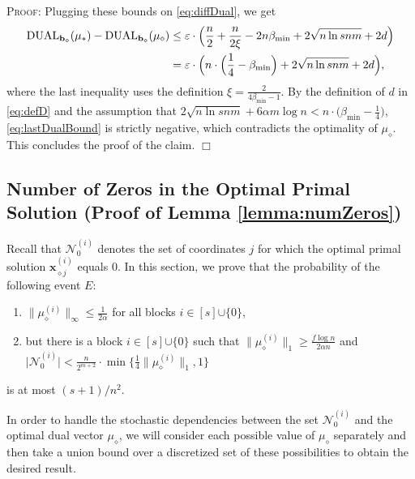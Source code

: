 \documentclass{article}
\newcommand{\e}{\varepsilon}
\newcommand{\xv}[0]{\mathbf{x}}
\newcommand{\bv}[0]{\mathbf{b}}
\newcommand{\normm}[1]{\big\lVert#1\big\rVert}
\newenvironment{proof}[1][]
   {\textsc{Proof#1: }}
   {\hfill$\Box$\smallskip}
\newcommand{\LAG}{\textup{DUAL}}
\begin{document}
\begin{proof}
    Plugging these bounds on \eqref{eq:diffDual}, we get
    \begin{align}
    \LAG_{\bv_{\diamond}}(\mu_*) - \LAG_{\bv_{\diamond}}(\mu_\diamond) &\le \e \cdot \Big(\frac{n}{2} + \frac{n}{2\xi} - 2n\beta_{\min} + 2 \sqrt{n \ln s n m} + 2d\Big) \notag\\
    &= \e \cdot \Big(n \cdot \Big(\frac{1}{4} - \beta_{\min}\Big) + 2 \sqrt{n \ln s n m} + 2d\Big), \label{eq:lastDualBound}
    \end{align}
    where the last inequality uses the definition $\xi = \frac{2}{4 \beta_{\min} - 1}$. By the definition of $d$ in \eqref{eq:defD} and the assumption that
    $2 \sqrt{n \ln s n m} + 6\alpha m \log n < n \cdot \big(\beta_{\min} - \frac{1}{4}\big)$, \eqref{eq:lastDualBound} is strictly negative, which contradicts the optimality of $\mu_{\diamond}$. This concludes the proof of the claim. 
\end{proof}


\subsection{Number of Zeros in the Optimal Primal Solution (Proof of Lemma \ref{lemma:numZeros})} \label{sec:numZeros}

Recall that $\mathcal{N}_0^{(i)}$ denotes the set of coordinates $j$ for which the optimal primal solution $\xv^{(i)}_{\diamond j}$ equals $0$.
In this section, we prove that the probability of the following event $E$:
\vspace{-6pt}
\begin{enumerate}
    \item $\|\mu^{(i)}_{\diamond}\|_{\infty} \le \frac{1}{2\alpha}$ for all blocks $i \in [s] {\cup \{0\}}$, \vspace{-2pt}
    \item but there is a block $i \in [s] {\cup \{0\}}$ such that $\|\mu^{(i)}_{\diamond}\|_1 \ge \frac{f \log n}{2\alpha n}$ and $\big|\mathcal{N}_0^{(i)}\big| < \frac{n}{2^{m+{2}}} \cdot \min\big\{ \frac{1}{4} \normm{\mu^{(i)}_\diamond}_1, 1\big\}$ \vspace{-4pt}
\end{enumerate}
is at most ${(s+1)/n^2}$.

In order to handle the stochastic dependencies between the set $\mathcal{N}_0^{(i)}$ and the optimal dual vector $\mu_{\diamond}$, we will consider each possible value of $\mu_{\diamond}$ separately and then take a union bound over a discretized set of these possibilities to obtain the desired result.
\end{document}
